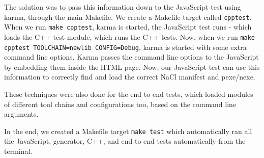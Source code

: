 The solution was to pass this information down to the JavaScript test using karma, through the main Makefile. We create a Makefile target called \lstinline{cpptest}. When we run \lstinline{make cpptest}, karma is started, the JavaScript test runs - which loads the C++ test module, which runs the C++ tests. Now, when we run \lstinline{make cpptest TOOLCHAIN=newlib CONFIG=Debug}, karma is started with some extra command line options. Karma passes the command line options to the JavaScript by embedding them inside the HTML page. Now, our JavaScript test can use this information to correctly find and load the correct NaCl manifest and pexe/nexe.

These techniques were also done for the end to end tests, which loaded modules of different tool chains and configurations too, based on the command line arguments.

In the end, we created a Makefile target \lstinline{make test} which automatically ran all the JavaScript, generator, C++, and end to end tests automatically from the terminal.

